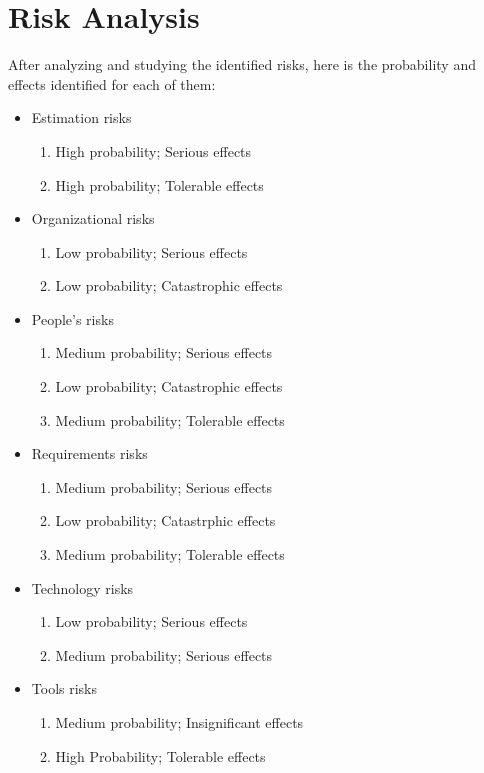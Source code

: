 \section{Risk Analysis}
After analyzing and studying the identified risks, here is the probability and effects identified for each of them:

\begin{itemize}
    \item Estimation risks
    \begin{enumerate}
        \item High probability; Serious effects
        \item High probability; Tolerable effects
    \end{enumerate}
    \item Organizational risks
    \begin{enumerate}
        \item Low probability; Serious effects
        \item Low probability; Catastrophic effects
    \end{enumerate}
    \item People's risks
    \begin{enumerate}
        \item Medium probability; Serious effects
        \item Low probability; Catastrophic effects
        \item Medium probability; Tolerable effects
    \end{enumerate}
    \item Requirements risks
    \begin{enumerate}
        \item Medium probability; Serious effects
        \item Low probability; Catastrphic effects
        \item Medium probability; Tolerable effects
    \end{enumerate}
    \item Technology risks
    \begin{enumerate}
        \item Low probability; Serious effects
        \item Medium probability; Serious effects
    \end{enumerate}
    \item Tools risks
    \begin{enumerate}
        \item Medium probability; Insignificant effects
        \item High Probability; Tolerable effects
    \end{enumerate}
\end{itemize}

